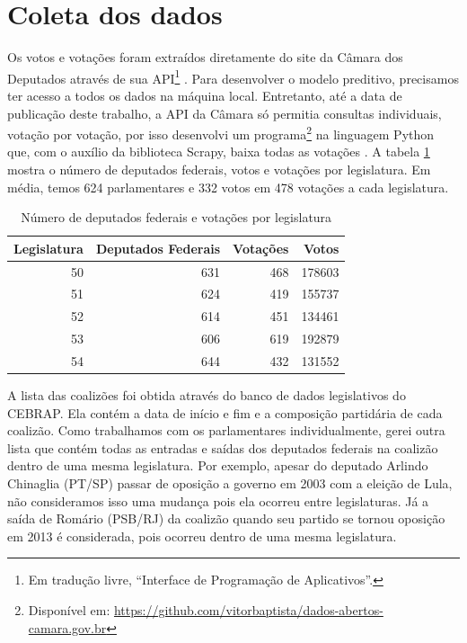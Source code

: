 \documentclass[a4paper,titlepage]{ppgi}\usepackage[]{graphicx}\usepackage[]{color}
\newenvironment{knitrout}{}{} %
\begin{document}
\section{Coleta dos dados}



Os votos e votações foram extraídos diretamente do site da Câmara dos Deputados
através de sua \gls{API}\footnote{Em tradução livre, ``Interface de Programação
de Aplicativos''.} \cite{CamaraDosDeputados2015}. Para desenvolver o modelo
preditivo, precisamos ter acesso a todos os dados na máquina local. Entretanto,
até a data de publicação deste trabalho, a \gls{API} da Câmara só permitia
consultas individuais, votação por votação, por isso desenvolvi um
programa\footnote{Disponível em:
\url{https://github.com/vitorbaptista/dados-abertos-camara.gov.br}} na
linguagem Python que, com o auxílio da biblioteca Scrapy, baixa todas as
votações \cite{Python276,Scrapy}. A tabela
\ref{table:estatisticas-legislaturas} mostra o número de deputados federais,
votos e votações por legislatura. Em média, temos 624
parlamentares e 332 votos em
478 votações a cada legislatura.

\begin{table}
\centering
\begin{knitrout}
\color{fgcolor}
\begin{tabular}{r|r|r|r}
\hline
Legislatura & Deputados Federais & Votações & Votos\\
\hline
50 & 631 & 468 & 178603\\
\hline
51 & 624 & 419 & 155737\\
\hline
52 & 614 & 451 & 134461\\
\hline
53 & 606 & 619 & 192879\\
\hline
54 & 644 & 432 & 131552\\
\hline
\end{tabular}


\end{knitrout}
\caption{Número de deputados federais e votações por legislatura}
\label{table:estatisticas-legislaturas}
\end{table}

A lista das coalizões foi obtida através do banco de dados
legislativos do \gls{CEBRAP}. Ela contém a data de início e fim e a composição
partidária de cada coalizão. Como trabalhamos com os parlamentares
individualmente, gerei outra lista que contém todas as entradas e saídas dos
deputados federais na coalizão dentro de uma mesma legislatura. Por exemplo,
apesar do deputado Arlindo Chinaglia (PT/SP) passar de oposição a governo
em 2003 com a eleição de Lula, não consideramos isso uma mudança pois ela
ocorreu entre legislaturas. Já a saída de Romário (PSB/RJ) da coalizão quando
seu partido se tornou oposição em 2013 é considerada, pois ocorreu dentro de
uma mesma legislatura.
\end{document}
